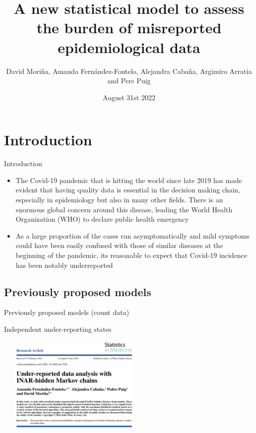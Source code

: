 \documentclass[aspectratio=169,usepdftitle=true]{beamer}
\title{A new statistical model to assess the burden of misreported epidemiological data}
\institute{Reuni\'on anual SEE 2022}
\date{August 31st 2022}
\author{David Mori\~na, Amanda Fern\'andez-Fontelo, Alejandra Caba\~na, Argimiro Arratia and Pere Puig}
\begin{document}
\section{Introduction}

\begin{frame}{Introduction}
\begin{itemize}
 \item The Covid-19 pandemic that is hitting the world since late 2019 has made evident that having quality data is essential in the decision making chain, especially in epidemiology but also in many other fields. There is an enormous global concern around this disease, leading the World Health Organization (WHO) to declare public health emergency
 \item As a large proportion of the cases run asymptomatically and mild symptoms could have been easily confused with those of similar diseases at the beginning of the pandemic, its reasonable to expect that Covid-19 incidence has been notably underreported
\end{itemize}
\end{frame}

\subsection{Previously proposed models}
\begin{frame}[c]{Previously proposed models (count data)}
    \begin{block}{Independent under-reporting states}
        \begin{center}
           \includegraphics[height=4.7cm,width=7.5cm]{SiM1.png}
        \end{center}
    \end{block}
\end{frame}
\end{document}

